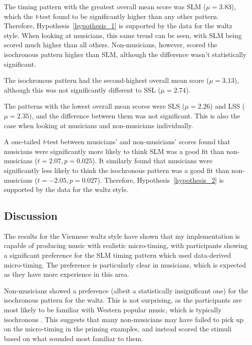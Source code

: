 \documentclass[12pt,twoside,openright]{report}
\begin{document}
The timing pattern with the greatest overall mean score was SLM ($\mu=3.83$), which
the \textit{t}-test found to be significantly higher than any other pattern. Therefore,
Hypothesis~\ref{hypothesis_1} is supported by the data for the waltz style. When looking
at musicians, this same trend can be seen, with SLM being scored much higher
than all others. Non-musicians, however, scored the isochronous pattern higher
than SLM, although the difference wasn't statistically significant.

The isochronous pattern had the second-highest overall mean score ($\mu=3.13$),
although this was not significantly different to SSL ($\mu=2.74$).

The patterns with the lowest overall mean scores were SLS ($\mu=2.26$) and LSS ($\mu=2.
35$), and the difference between them was not significant. This is also the case
when looking at musicians and non-musicians individually.

A one-tailed \textit{t}-test between musicians' and non-musicians' scores found that
musicians were significantly more likely to think SLM was a good fit than
non-musicians ($t=2.07, p=0.025$). It similarly found that musicians were
significantly less likely to think the isochronous pattern was a good fit than
non-musicians ($t=-2.05, p=0.027$). Therefore, Hypothesis~\ref{hypothesis_2} is supported by the
data for the waltz style.


\subsection{Discussion} \label{user_study_discussion}

The results for the Viennese waltz style have shown that my implementation is
capable of producing music with realistic micro-timing, with participants
showing a significant preference for the SLM timing pattern which used
data-derived micro-timing. The preference is particularly clear in musicians,
which is expected as they have more experience in this area.

Non-musicians showed a preference (albeit a statistically insignificant one) for the
isochronous pattern for the waltz. This is not surprising, as the participants
are most likely to be familiar with Western popular music, which is typically
isochronous \cite{soley2010}. This suggests that many non-musicians may have failed to pick up on
the micro-timing in the priming examples, and instead scored the stimuli based
on what sounded most familiar to them.
\end{document}
